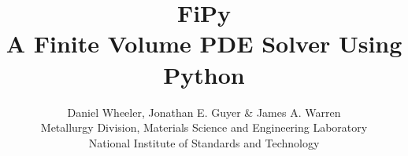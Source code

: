 \documentclass[letterpaper,oldfontcommands]{memoir}
\newcommand{\logo}{\rotatebox{4}{\textcolor{red}{\( \varphi \)}}\kern-.7em\raisebox{-.15em}{\textcolor{blue}{\( \pi\)}}}
\begin{document}
\settypeblocksize{9in}{7in}{*}
\setlrmargins{*}{*}{*}
\setulmargins{*}{*}{*}


\checkandfixthelayout

\fixpdflayout

\setlength{\parindent}{0ex}
\setlength{\fboxrule}{2\fboxrule}
\newlength{\BCL} %

\pagestyle{Ruled}
\renewcommand{\sectionmark}[1]{\markboth{#1}{}}
\renewcommand{\subsectionmark}[1]{\markright{#1}}

\newenvironment{Ventry}[1]%
  {\begin{list}{}{%
    \renewcommand{\makelabel}[1]{\texttt{##1:}\hfil}%
    \settowidth{\labelwidth}{\texttt{#1:}}%
    \setlength{\leftmargin}{\labelsep}%
    \addtolength{\leftmargin}{\labelwidth}}}%
  {\end{list}}

\title{
FiPy\\
{\large A Finite Volume PDE Solver Using Python} \\
}

\author{Daniel Wheeler, Jonathan E. Guyer \& James A. Warren \\[2ex]
Metallurgy Division, Materials Science and Engineering Laboratory\\
National Institute of Standards and Technology}

\maketitle

% 
% 
% 
% 
% 
% 
% 
% 
% 












\printindex
\end{document}
